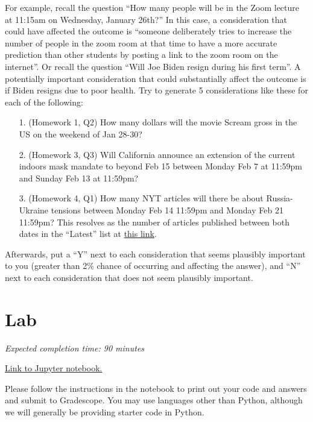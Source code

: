 \documentclass[11pt]{article}
\begin{document}
For example, recall the question ``How many people will be in the Zoom lecture at 11:15am on Wednesday, January 26th?'' In this case, a consideration that could have affected the outcome is ``someone deliberately tries to increase the number of people in the zoom room at that time to have a more accurate prediction than other students by posting a link to the zoom room on the internet''. Or recall the question ``Will Joe Biden resign during his first term''. A potentially important consideration that could substantially affect the outcome is if Biden resigns due to poor health. Try to generate 5 considerations like these for each of the following:

\begin{enumerate}
	\item[1.] (Homework 1, Q2) How many dollars will the movie Scream gross in the US on the weekend of Jan 28-30?

	\item[2.] (Homework 3, Q3) Will California announce an extension of the current indoors mask mandate to beyond Feb 15 between Monday Feb 7 at 11:59pm and Sunday Feb 13 at 11:59pm?

	\item[3.] (Homework 4, Q1) How many NYT articles will there be about Russia-Ukraine tensions between Monday Feb 14 11:59pm and Monday Feb 21 11:59pm? This resolves as the number of articles published between both dates in the ``Latest'' list at \href{https://www.nytimes.com/news-event/ukraine-russia?name=styln-russia-ukraine&region=TOP_BANNER&block=storyline_menu_recirc&action=click&pgtype=LegacyCollection&variant=0_Control}{this link}.
\end{enumerate}

Afterwards, put a ``Y'' next to each consideration that seems plausibly important to you (greater than 2\% chance of occurring and affecting the answer), 
and ``N'' next to each consideration that does not seem plausibly important.

\section*{Lab}

\emph{Expected completion time: 90 minutes}

\href{https://datahub.berkeley.edu/hub/user-redirect/git-pull?repo=https%3A%2F%2Fgithub.com%2[…]stat-157-260-website%2Fhw%2Fhw4%2Fhw4lab.ipynb&branch=main}{Link to Jupyter notebook.}

Please follow the instructions in the notebook to print out your code and answers and submit to Gradescope. You may use languages other than Python, although we will generally be providing starter code in Python.
\end{document}
